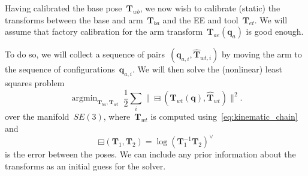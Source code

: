 \documentclass{article}
\DeclareMathOperator*{\argmin}{argmin}
\begin{document}
Having calibrated the base pose~$\bm{T}_{wb}$, we now wish to calibrate
(static) the transforms between the base and arm~$\bm{T}_{ba}$ and the EE and
tool~$\bm{T}_{et}$. We will assume that factory calibration for the arm
transform~$\bm{T}_{ae}(\bm{q}_a)$ is good enough.

To do so, we will collect a sequence of
pairs~$(\bm{q}_{a,i},\hat{\bm{T}}_{wt,i})$ by moving the arm to the sequence of
configurations~$\bm{q}_{a,i}$. We will then solve the (nonlinear) least squares
problem
\begin{equation}
  \argmin_{\bm{T}_{ba},\bm{T}_{wt}}\ \frac{1}{2}\sum_i\|\boxminus(\bm{T}_{wt}(\bm{q}),\hat{\bm{T}}_{wt})\|^2.
\end{equation}
over the manifold~$SE(3)$, where~$\bm{T}_{wt}$ is computed using~\eqref{eq:kinematic_chain} and
\begin{equation}
  \boxminus(\bm{T}_1,\bm{T}_2) = \log(\bm{T}_1^{-1}\bm{T}_2)^\vee
\end{equation}
is the error between the poses. We can include any prior information about the
transforms as an initial guess for the solver.
\end{document}
